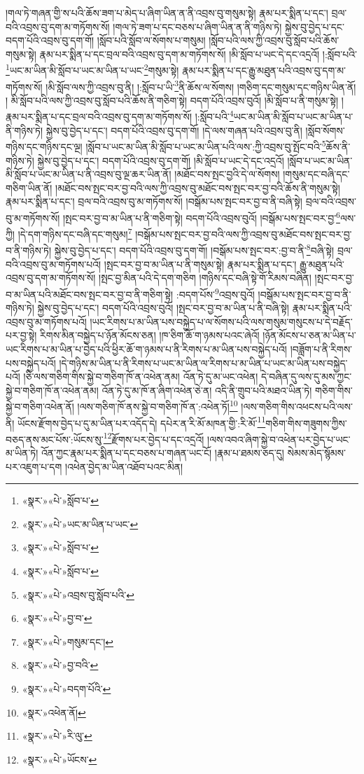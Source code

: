 །གལ་ཏེ་གཞན་གྱི་ས་པའི་ཆོས་ཟག་པ་མེད་པ་ཞིག་ཡིན་ན་ནི་འབྲས་བུ་གསུམ་སྟེ། རྣམ་པར་སྨིན་པ་དང་། བྲལ་བའི་འབྲས་བུ་དག་མ་གཏོགས་སོ། །གལ་ཏེ་ཟག་པ་དང་བཅས་པ་ཞིག་ཡིན་ན་ནི་གཉིས་ཏེ། སྐྱེས་བུ་བྱེད་པ་དང་བདག་པོའི་འབྲས་བུ་དག་གོ། །སློབ་པའི་སློབ་ལ་སོགས་པ་གསུམ། །སློབ་པའི་ལས་ཀྱི་འབྲས་བུ་སློབ་པའི་ཆོས་གསུམ་སྟེ། རྣམ་པར་སྨིན་པ་དང་བྲལ་བའི་འབྲས་བུ་དག་མ་གཏོགས་སོ། །མི་སློབ་པ་ཡང་དེ་དང་འདྲའོ། །:སློབ་པའི་\footnote{«སྣར་»«པེ་»སློབ་པ་}ཡང་མ་ཡིན་མི་སློབ་པ་ཡང་མ་ཡིན་པ་ཡང་\footnote{«སྣར་»«པེ་»ཡང་མ་ཡིན་པ་ཡང་}གསུམ་སྟེ། རྣམ་པར་སྨིན་པ་དང་རྒྱུ་མཐུན་པའི་འབྲས་བུ་དག་མ་གཏོགས་སོ། །མི་སློབ་ལས་ཀྱི་འབྲས་བུ་ནི། །:སློབ་པ་ཡི་\footnote{«སྣར་»«པེ་»སློབ་པ་}ནི་ཆོས་ལ་སོགས། །གཅིག་དང་གསུམ་དང་གཉིས་ཡིན་ནོ། །
མི་སློབ་པའི་ལས་ཀྱི་འབྲས་བུ་སློབ་པའི་ཆོས་ནི་གཅིག་སྟེ། བདག་པོའི་འབྲས་བུའོ། །མི་སློབ་པ་ནི་གསུམ་སྟེ། །རྣམ་པར་སྨིན་པ་དང་བྲལ་བའི་འབྲས་བུ་དག་མ་གཏོགས་སོ། །:སློབ་པའི་\footnote{«སྣར་»«པེ་»སློབ་པ་}ཡང་མ་ཡིན་མི་སློབ་པ་ཡང་མ་ཡིན་པ་ནི་གཉིས་ཏེ། སྐྱེས་བུ་བྱེད་པ་དང་། བདག་པོའི་འབྲས་བུ་དག་གོ། །དེ་ལས་གཞན་པའི་འབྲས་བུ་ནི། །སློབ་སོགས་གཉིས་དང་གཉིས་དང་ལྔ། །སློབ་པ་ཡང་མ་ཡིན་མི་སློབ་པ་ཡང་མ་ཡིན་པའི་ལས་:ཀྱི་འབྲས་བུ་སྤོང་བའི་\footnote{«སྣར་»«པེ་»འབྲས་བུ་སློབ་པའི་}ཆོས་ནི་གཉིས་ཏེ། སྐྱེས་བུ་བྱེད་པ་དང་། བདག་པོའི་འབྲས་བུ་དག་གོ། །མི་སློབ་པ་ཡང་དེ་དང་འདྲའོ། །སློབ་པ་ཡང་མ་ཡིན་མི་སློབ་པ་ཡང་མ་ཡིན་པ་ནི་འབྲས་བུ་ལྔ་ཆར་ཡིན་ནོ། །མཐོང་བས་སྤང་བྱའི་དེ་ལ་སོགས། །གསུམ་དང་བཞི་དང་གཅིག་ཡིན་ནོ། །མཐོང་བས་སྤང་བར་བྱ་བའི་ལས་ཀྱི་འབྲས་བུ་མཐོང་བས་སྤང་བར་བྱ་བའི་ཆོས་ནི་གསུམ་སྟེ། རྣམ་པར་སྨིན་པ་དང་། བྲལ་བའི་འབྲས་བུ་མ་གཏོགས་སོ། །བསྒོམ་པས་སྤང་བར་བྱ་བ་ནི་བཞི་སྟེ། བྲལ་བའི་འབྲས་བུ་མ་གཏོགས་སོ། །སྤང་བར་བྱ་བ་མ་ཡིན་པ་ནི་གཅིག་སྟེ། བདག་པོའི་འབྲས་བུའོ། །བསྒོམ་པས་སྤང་བར་བྱ་\footnote{«སྣར་»«པེ་»བྱ་བ་}ལས་ཀྱི། །དེ་དག་གཉིས་དང་བཞི་དང་གསུམ།\footnote{«སྣར་»«པེ་»གསུམ་དང་།} །བསྒོམ་པས་སྤང་བར་བྱ་བའི་ལས་ཀྱི་འབྲས་བུ་མཐོང་བས་སྤང་བར་བྱ་བ་ནི་གཉིས་ཏེ། སྐྱེས་བུ་བྱེད་པ་དང་། བདག་པོའི་འབྲས་བུ་དག་གོ། །བསྒོམ་པས་སྤང་བར་:བྱ་བ་ནི་\footnote{«སྣར་»«པེ་»བྱ་བའི་}བཞི་སྟེ། བྲལ་བའི་འབྲས་བུ་མ་གཏོགས་པའོ། །སྤང་བར་བྱ་བ་མ་ཡིན་པ་ནི་གསུམ་སྟེ། རྣམ་པར་སྨིན་པ་དང་། རྒྱུ་མཐུན་པའི་འབྲས་བུ་དག་མ་གཏོགས་སོ། །སྤང་བྱ་མིན་པའི་དེ་དག་གཅིག །གཉིས་དང་བཞི་སྟེ་གོ་རིམས་བཞིན། །སྤང་བར་བྱ་བ་མ་ཡིན་པའི་མཐོང་བས་སྤང་བར་བྱ་བ་ནི་གཅིག་སྟེ། :བདག་པོས་\footnote{«སྣར་»«པེ་»བདག་པོའི་}འབྲས་བུའོ། །བསྒོམ་པས་སྤང་བར་བྱ་བ་ནི་གཉིས་ཏེ། སྐྱེས་བུ་བྱེད་པ་དང་། བདག་པོའི་འབྲས་བུའོ། །སྤང་བར་བྱ་བ་མ་ཡིན་པ་ནི་བཞི་སྟེ། རྣམ་པར་སྨིན་པའི་འབྲས་བུ་མ་གཏོགས་པའོ། །ཡང་རིགས་པ་མ་ཡིན་པས་བསྐྱེད་པ་ལ་སོགས་པའི་ལས་གསུམ་གསུངས་པ་དེ་བརྗོད་པར་བྱ་སྟེ། རིགས་མིན་བསྐྱེད་པ་ཉོན་མོངས་ཅན། །ཁ་ཅིག་ཆོ་ག་ཉམས་པའང་ཞེའོ། །ཉོན་མོངས་པ་ཅན་མ་ཡིན་པ་ཡང་རིགས་པ་མ་ཡིན་པ་བྱེད་པའི་ཕྱིར་ཆོ་ག་ཉམས་པ་ནི་རིགས་པ་མ་ཡིན་པས་བསྐྱེད་པའོ། །བཟློག་པ་ནི་རིགས་པས་བསྐྱེད་པའོ། །དེ་གཉིས་མ་ཡིན་པ་ནི་རིགས་པ་ཡང་མ་ཡིན་ལ་རིགས་པ་མ་ཡིན་པ་ཡང་མ་ཡིན་པས་བསྐྱེད་པའོ། །ཅི་ལས་གཅིག་གིས་སྐྱེ་བ་གཅིག་ཁོ་ན་འཕེན་ནམ། འོན་ཏེ་དུ་མ་ཡང་འཕེན། དེ་བཞིན་དུ་ལས་དུ་མས་ཀྱང་སྐྱེ་བ་གཅིག་ཁོ་ན་འཕེན་ནམ། འོན་ཏེ་དུ་མ་ཁོ་ན་ཞིག་འཕེན་ཅེ་ན། འདི་ནི་གྲུབ་པའི་མཐའ་ཡིན་ཏེ། གཅིག་གིས་སྐྱེ་བ་གཅིག་འཕེན་ནོ། །ལས་གཅིག་ཁོ་ནས་སྐྱེ་བ་གཅིག་ཁོ་ན་:འཕེན་ཏོ།\footnote{«སྣར་»འཕེན་ནོ།} །ལས་གཅིག་གིས་འཕངས་པའི་ལས་ནི། ཡོངས་རྫོགས་བྱེད་པ་དུ་མ་ཡིན་པར་འདོད་དེ། དཔེར་ན་རི་མོ་མཁན་གྱི་:རི་མོ་\footnote{«སྣར་»«པེ་»རི་ལུ་}གཅིག་གིས་གཟུགས་ཀྱིས་བཅད་ནས་མང་པོས་:ཡོངས་སུ་\footnote{«སྣར་»«པེ་»ཡོངས་}རྫོགས་པར་བྱེད་པ་དང་འདྲའོ། །ལས་འབའ་ཞིག་སྐྱེ་བ་འཕེན་པར་བྱེད་པ་ཡང་མ་ཡིན་ཏེ། འོན་ཀྱང་རྣམ་པར་སྨིན་པ་དང་བཅས་པ་གཞན་ཡང་ངོ། །རྣམ་པ་ཐམས་ཅད་དུ། སེམས་མེད་སྙོམས་པར་འཇུག་པ་དག །འཕེན་བྱེད་མ་ཡིན་འཐོབ་པའང་མིན། 